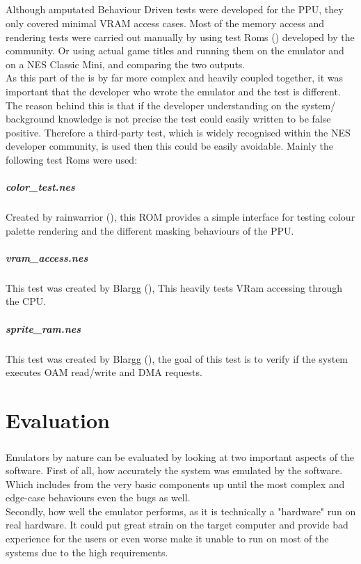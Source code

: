\documentclass[]{report}
\begin{document}
\paragraph{ }
Although amputated Behaviour Driven tests were developed for the PPU, they only covered minimal VRAM access cases. Most of the memory access and rendering tests were carried out manually by using test Roms (\cite{TRIN}) developed by the community. Or using actual game titles and running them on the emulator and on a NES Classic Mini, and comparing the two outputs.
\\
As this part of the is by far more complex and heavily coupled together, it was important that the developer who wrote the emulator and the test is different. The reason behind this is that if the developer understanding on the system/ background knowledge is not precise the test could easily written to be false positive. Therefore a third-party test, which is widely recognised within the NES developer community, is used then this could be easily avoidable. Mainly the following test Roms were used: 

\paragraph{color\_test.nes}
Created by rainwarrior (\cite{RNTS}), this ROM provides a simple interface for testing colour palette rendering and the different masking behaviours of the PPU.

\paragraph{vram\_access.nes}
This test was created by Blargg (\cite{BLGT}), This heavily tests VRam accessing through the CPU.

\paragraph{sprite\_ram.nes}
This test was created by Blargg (\cite{BLGT}), the goal of this test is to verify if the system executes OAM read/write and DMA requests.

 \chapter{Evaluation}
 \paragraph{ }
Emulators by nature can be evaluated by looking at two important aspects of the software. First of all, how accurately the system was emulated by the software. Which includes from the very basic components up until the most complex and edge-case behaviours even the bugs as well.
\\
Secondly, how well the emulator performs, as it is technically a "hardware" run on real hardware. It could put great strain on the target computer and provide bad experience for the users or even worse make it unable to run on most of the systems due to the high requirements.
\end{document}
